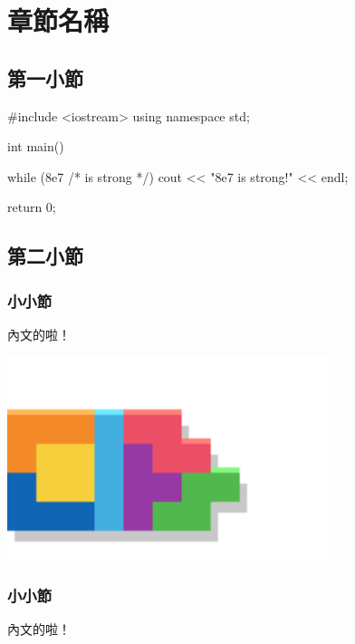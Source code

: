 \documentclass[main.tex]{subfiles}
\begin{document}
\chapter{章節名稱}

\section{第一小節}







\pagebreak

\begin{C++}
#include <iostream>
using namespace std;

int main() {
	while (8e7 /* is strong */) {
		cout << "8e7 is strong!" << endl;
	}

	return 0;
}
\end{C++}

\section{第二小節}

\subsection{小小節}
內文的啦！

\includegraphics*[width = 0.7\textwidth]{images/Sample/Sample.png}

\subsection{小小節}
內文的啦！
\end{document}
